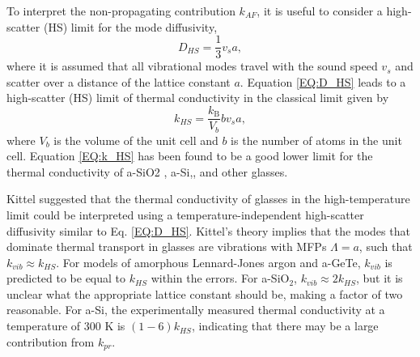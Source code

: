 \documentclass[aps,prb,onecolumn,preprint,superscriptaddress,footinbib,amsmath,amssymb,floatfix]{revtex4}
\begin{document}
To interpret the non-propagating contribution $k_{AF}$, it is useful 
to consider a high-scatter (HS) limit for the mode diffusivity,
\begin{equation}\label{EQ:D_HS}
D_{HS} = \frac{1}{3} v_s a,
\end{equation}
where it is assumed that all vibrational modes travel with the sound speed  
$v_s$ and scatter over a distance of the lattice constant $a$.
\cite{cahill_lattice_1988}  
Equation \eqref{EQ:D_HS} leads to a high-scatter (HS) limit of 
thermal conductivity in the classical limit given by
\cite{cahill_lattice_1988} 
\begin{equation}\label{EQ:k_HS}
k_{HS} = \frac{k_{\text{B}}}{V_b}b v_s a,
\end{equation}
where $V_b$ is the volume of the unit cell and $b$ is the number of atoms 
in the unit cell.  
Equation \eqref{EQ:k_HS} has been found to be a good lower limit 
for the thermal conductivity of a-SiO2
\cite{freeman_thermal_1986,cahill_lattice_1988,baldi_thermal_2008}, 
a-Si,\cite{feldman_thermal_1993,cahill_thermal_1994,
feldman_numerical_1999,he_heat_2011}, 
and other glasses.\cite{
kittel_interpretation_1949,
cahill_thermal_1989,
pohl_low-temperature_2002,
sosso_thermal_2012,
larkin_predicting_2013}

Kittel suggested that  
the thermal conductivity of glasses in the high-temperature limit could 
be interpreted 
using a temperature-independent high-scatter diffusivity similar to 
Eq. \eqref{EQ:D_HS}.\cite{kittel_interpretation_1949}  
Kittel's theory 
implies that the modes that dominate thermal transport in glasses are 
vibrations with MFPs $\Lambda=a$, such that   
$k_{vib} \approx k_{HS}$.
\cite{kittel_interpretation_1949,graebner_phonon_1986}  
For models of amorphous Lennard-Jones argon
\cite{larkin_predicting_2013} and 
a-GeTe\cite{sosso_thermal_2012}, $k_{vib}$ is predicted to be equal 
to $k_{HS}$ within the errors.   
For a-SiO$_2$, $k_{vib} \approx 2k_{HS}$, but it is unclear what the 
appropriate lattice constant should be, making a factor of 
two reasonable.   
For a-Si, the experimentally measured thermal conductivity at 
a temperature of 
300 K is $(1-6) k_{HS}$,
\cite{feldman_thermal_1993,cahill_thermal_1994,
feldman_numerical_1999,liu_high_2009,yang_anomalously_2010,
he_heat_2011} 
indicating that there may be a large contribution from $k_{pr}$. 
\end{document}
